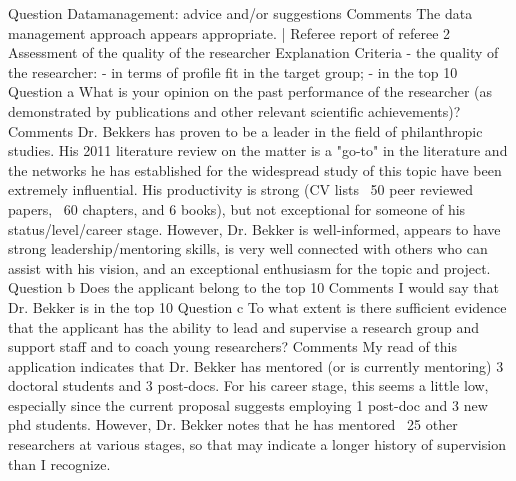 \documentclass[twocolumn, serif, rga, numeric]{jote-article}
\begin{document}
Question
Datamanagement: advice and/or suggestions
Comments
The data management approach appears appropriate.
|  Referee report of referee 2
Assessment of the quality of the researcher
Explanation
Criteria - the quality of the researcher: - in terms of profile fit in the target group; - in the top 10%
Question a
What is your opinion on the past performance of the researcher (as demonstrated by publications and other relevant scientific achievements)?
Comments
Dr. Bekkers has proven to be a leader in the field of philanthropic studies. His 2011 literature review on the matter is a "go-to" in the literature and the networks he has established for the widespread study of this topic have been extremely influential. His productivity is strong (CV lists ~50 peer reviewed papers, ~60 chapters, and 6 books), but not exceptional for someone of his status/level/career stage. However, Dr. Bekker is well-informed, appears to have strong leadership/mentoring skills, is very well connected with others who can assist with his vision, and an exceptional enthusiasm for the topic and project.
Question b
Does the applicant belong to the top 10%
Comments
I would say that Dr. Bekker is in the top 10%
Question c
To what extent is there sufficient evidence that the applicant has the ability to lead and supervise a research group and support staff and to coach young researchers?
Comments
My read of this application indicates that Dr. Bekker has mentored (or is currently mentoring) 3 doctoral students and 3 post-docs. For his career stage, this seems a little low, especially since the current proposal suggests employing 1 post-doc and 3 new phd students.
However, Dr. Bekker notes that he has mentored ~25 other researchers at various stages, so that may indicate a longer history of supervision than I recognize.
\end{document}
